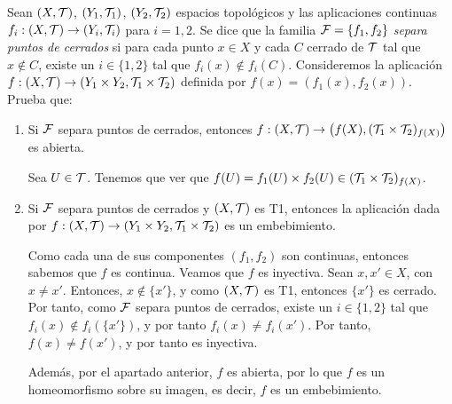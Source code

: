\documentclass[12pt]{article}
\newcommand{\T}[0]{\cc{T}}
\begin{document}
    \begin{ejercicio}[3 puntos]
        Sean $(X,\T)$, $(Y_1,\T_1)$, $(Y_2,\T_2)$ espacios topológicos y las aplicaciones continuas $f_i:(X,\T)\to (Y_i,\T_i)$ para $i=1,2$.
        Se dice que la familia $\mathcal{F}=\{f_1,f_2\}$ \emph{separa puntos de cerrados} si para cada punto $x\in X$ y cada $C$ cerrado de $\T$ tal que $x\notin C$,
        existe un $i\in \{1,2\}$ tal que $f_i(x)\notin f_i(C)$. Consideremos la aplicación $f:(X,\T)\to (Y_1\times Y_2,\T_1\times \T_2)$ definida por
        $f(x)=(f_1(x),f_2(x))$. Prueba que:
        \begin{enumerate}
            \item Si $\mathcal{F}$ separa puntos de cerrados, entonces $f:(X,\T)\to \left(f(X),(\T_1\times \T_2)_{f(X)}\right)$ es abierta.
            
            Sea $U\in \T$. Tenemos que ver que $f(U)=f_1(U)\times f_2(U)\in (\T_1\times \T_2)_{f(X)}$.

            \item Si $\mathcal{F}$ separa puntos de cerrados y $(X,\T)$ es T1, entonces la aplicación dada por $f:(X,\T) \to (Y_1\times Y_2,\T_1\times \T_2)$ es un embebimiento.
            
            Como cada una de sus componentes $(f_1,f_2)$ son continuas, entonces sabemos que $f$ es continua. Veamos que $f$ es inyectiva. Sean $x,x'\in X$, con $x\neq x'$.
            Entonces, $x\notin \{x'\}$, y como $(X,\T)$ es T1, entonces $\{x'\}$ es cerrado. Por tanto, como $\mathcal{F}$ separa puntos de cerrados, existe un $i\in \{1,2\}$ tal que
            $f_i(x)\notin f_i(\{x'\})$, y por tanto $f_i(x)\neq f_i(x')$. Por tanto, $f(x)\neq f(x')$, y por tanto es inyectiva.
            
            Además, por el apartado anterior, $f$ es abierta, por lo que $f$ es un homeomorfismo sobre su imagen, es decir, $f$ es un embebimiento.
        \end{enumerate}
    \end{ejercicio}
    
\end{document}
